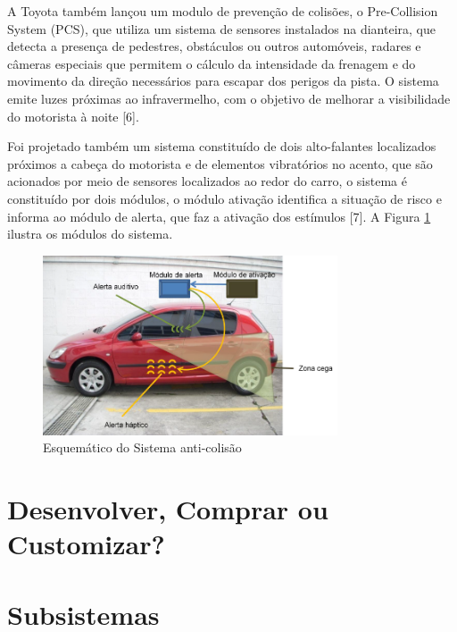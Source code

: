  A Toyota também lançou um modulo de prevenção de colisões, o Pre-Collision System (PCS), que utiliza um sistema de sensores instalados na
 dianteira, que detecta a presença de pedestres, obstáculos ou outros automóveis, radares e câmeras especiais que permitem o cálculo da intensidade
  da frenagem e do movimento da direção necessários para escapar dos perigos da pista. O sistema emite luzes próximas ao infravermelho, com o
  objetivo de melhorar a visibilidade do motorista à noite [6].

 Foi projetado também um sistema constituído de dois alto-falantes localizados próximos a cabeça do motorista e de elementos vibratórios no
 acento, que são acionados por meio de sensores localizados ao redor do carro, o sistema é constituído por dois módulos, o módulo ativação
 identifica a situação de risco e informa ao módulo de alerta, que faz a ativação dos estímulos [7]. A Figura \ref{fig:sistemaanticolisao} ilustra os módulos do sistema.


  \begin{figure}[h]
    \centering
    \includegraphics[width=330px, scale=0.5]{figuras/sistemaanticolisao}
    \caption{Esquemático do Sistema anti-colisão}
    \label{fig:sistemaanticolisao}
  \end{figure}


\section{Desenvolver, Comprar ou Customizar?}

\section{Subsistemas}
